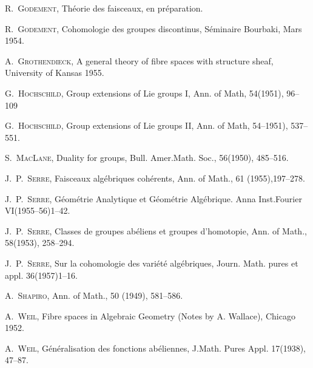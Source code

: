 \begin{list}{}
\item[{[9]}] R.\ \textsc{Godement}, Théorie des faisceaux, en préparation.

\item[{[10]}] R.\ \textsc{Godement}, Cohomologie des groupes discontinus,
Séminaire Bourbaki, Mars 1954.

\item[{[11]}] A.\ \textsc{Grothendieck}, A general theory of fibre spaces
with structure sheaf, University of Kansas 1955.

\item[{[12]}] G.\ \textsc{Hochschild}, Group extensions of Lie groups I,
Ann. of Math, 54(1951), 96--109

\item[{[13]}] G.\ \textsc{Hochschild}, Group extensions of Lie groups II,
Ann. of Math, 54--1951), 537--551.

\item[{[14]}] S.\ \textsc{MacLane}, Duality for groups,
Bull. Amer.Math. Soc., 56(1950), 485--516.

\item[{[15]}] J.\ P.\ \textsc{Serre}, Faisceaux algébriques cohérents,
Ann. of Math., 61 (1955),197--278.

\item[{[16]}] J.\ P.\ \textsc{Serre}, Géométrie Analytique et Géométrie
Algébrique. Anna Inst.Fourier VI(1955--56)1--42.

\item[{[17]}] J.\ P.\ \textsc{Serre}, Classes de groupes abéliens et groupes
d'homotopie, Ann. of Math., 58(1953), 258--294.

\item[{[18]}] J.\ P.\ \textsc{Serre}, Sur la cohomologie des variété
algébriques, Journ. Math. pures et appl. 36(1957)\mbox{1--16}.

\item[{[19]}] A.\ \textsc{Shapiro}, Ann. of Math., 50 (1949), 581--586.

\item[{[20]}] A.\ \textsc{Weil}, Fibre spaces in Algebraic Geometry
(Notes by A. Wallace), Chicago 1952.

\item[{[21]}] A.\ \textsc{Weil}, Généralisation des fonctions abéliennes,
J.Math. Pures Appl. 17(1938), 47--87.
\end{list}
\normalsize

